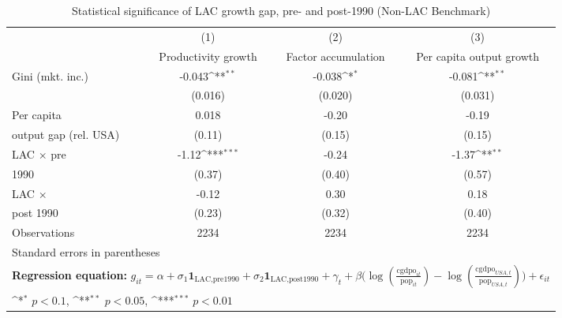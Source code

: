 \begin{table}[htbp]\centering
\def\sym#1{\ifmmode^{#1}\else\(^{#1}\)\fi}
\caption{Statistical significance of LAC growth gap, pre- and post-1990 (Non-LAC Benchmark)}
\begin{tabular}{l*{3}{c}}
\toprule
                &\multicolumn{1}{c}{(1)}&\multicolumn{1}{c}{(2)}&\multicolumn{1}{c}{(3)}\\
                &\multicolumn{1}{c}{Productivity growth}&\multicolumn{1}{c}{Factor accumulation}&\multicolumn{1}{c}{Per capita output growth}\\
\midrule
Gini (mkt. inc.)&   -0.043\sym{**} &   -0.038\sym{*}  &   -0.081\sym{**} \\
                &  (0.016)         &  (0.020)         &  (0.031)         \\
\addlinespace
Per capita      &    0.018         &    -0.20         &    -0.19         \\
output gap (rel. USA)&   (0.11)         &   (0.15)         &   (0.15)         \\
\addlinespace
LAC $\times$ pre&    -1.12\sym{***}&    -0.24         &    -1.37\sym{**} \\
1990            &   (0.37)         &   (0.40)         &   (0.57)         \\
\addlinespace
LAC $\times$    &    -0.12         &     0.30         &     0.18         \\
post 1990       &   (0.23)         &   (0.32)         &   (0.40)         \\
\midrule
Observations    &     2234         &     2234         &     2234         \\
\bottomrule
\multicolumn{4}{l}{\footnotesize Standard errors in parentheses}\\
\multicolumn{4}{l}{\footnotesize \textbf{Regression equation:} \(g_{it} = \alpha + \sigma_1 \mathbf{1}_{\textrm{LAC,pre1990}} + \sigma_2 \mathbf{1}_{\textrm{LAC,post1990}} + \gamma_t + \beta \big(\log (\frac{\textrm{cgdpo}_{it}}{\textrm{pop}_{it}} ) - \log (\frac{\textrm{cgdpo}_{USA,t}}{\textrm{pop}_{USA,t}}  ) \big) + \epsilon_{it}\)}\\
\multicolumn{4}{l}{\footnotesize \sym{*} \(p<0.1\), \sym{**} \(p<0.05\), \sym{***} \(p<0.01\)}\\
\end{tabular}
\end{table}
